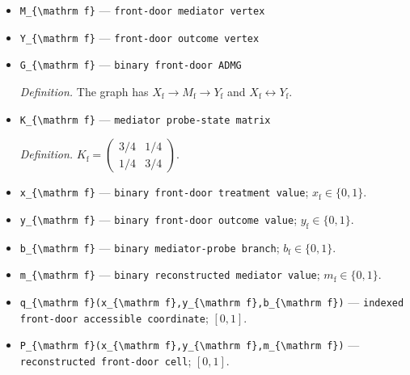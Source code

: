 \documentclass{article}
\begin{document}
\begin{itemize}
  \item \texttt{M\_\allowbreak{}\{\textbackslash{}\allowbreak{}mathrm f\}\allowbreak{}} --- \texttt{front-\allowbreak{}door mediator vertex}
  \item \texttt{Y\_\allowbreak{}\{\textbackslash{}\allowbreak{}mathrm f\}\allowbreak{}} --- \texttt{front-\allowbreak{}door outcome vertex}
  \item \texttt{G\_\allowbreak{}\{\textbackslash{}\allowbreak{}mathrm f\}\allowbreak{}} --- \texttt{binary front-\allowbreak{}door ADMG}
  \par\smallskip\noindent\emph{Definition.} The graph has \(X_{\mathrm f}\to M_{\mathrm f}\to Y_{\mathrm f}\) and \(X_{\mathrm f}\leftrightarrow Y_{\mathrm f}\).
  \item \texttt{K\_\allowbreak{}\{\textbackslash{}\allowbreak{}mathrm f\}\allowbreak{}} --- \texttt{mediator probe-\allowbreak{}state matrix}
  \par\smallskip\noindent\emph{Definition.} \(K_{\mathrm f}=\begin{pmatrix}3/4&1/4\\1/4&3/4\end{pmatrix}\).
  \item \texttt{x\_\allowbreak{}\{\textbackslash{}\allowbreak{}mathrm f\}\allowbreak{}} --- \texttt{binary front-\allowbreak{}door treatment value}; \(x_{\mathrm f}\in\{0,1\}\).
  \item \texttt{y\_\allowbreak{}\{\textbackslash{}\allowbreak{}mathrm f\}\allowbreak{}} --- \texttt{binary front-\allowbreak{}door outcome value}; \(y_{\mathrm f}\in\{0,1\}\).
  \item \texttt{b\_\allowbreak{}\{\textbackslash{}\allowbreak{}mathrm f\}\allowbreak{}} --- \texttt{binary mediator-\allowbreak{}probe branch}; \(b_{\mathrm f}\in\{0,1\}\).
  \item \texttt{m\_\allowbreak{}\{\textbackslash{}\allowbreak{}mathrm f\}\allowbreak{}} --- \texttt{binary reconstructed mediator value}; \(m_{\mathrm f}\in\{0,1\}\).
  \item \texttt{q\_\allowbreak{}\{\textbackslash{}\allowbreak{}mathrm f\}\allowbreak{}(x\_\allowbreak{}\{\textbackslash{}\allowbreak{}mathrm f\}\allowbreak{},\allowbreak{}y\_\allowbreak{}\{\textbackslash{}\allowbreak{}mathrm f\}\allowbreak{},\allowbreak{}b\_\allowbreak{}\{\textbackslash{}\allowbreak{}mathrm f\}\allowbreak{})} --- \texttt{indexed front-\allowbreak{}door accessible coordinate}; \([0,1]\).
  \item \texttt{P\_\allowbreak{}\{\textbackslash{}\allowbreak{}mathrm f\}\allowbreak{}(x\_\allowbreak{}\{\textbackslash{}\allowbreak{}mathrm f\}\allowbreak{},\allowbreak{}y\_\allowbreak{}\{\textbackslash{}\allowbreak{}mathrm f\}\allowbreak{},\allowbreak{}m\_\allowbreak{}\{\textbackslash{}\allowbreak{}mathrm f\}\allowbreak{})} --- \texttt{reconstructed front-\allowbreak{}door cell}; \([0,1]\).

\end{itemize}
\end{document}
